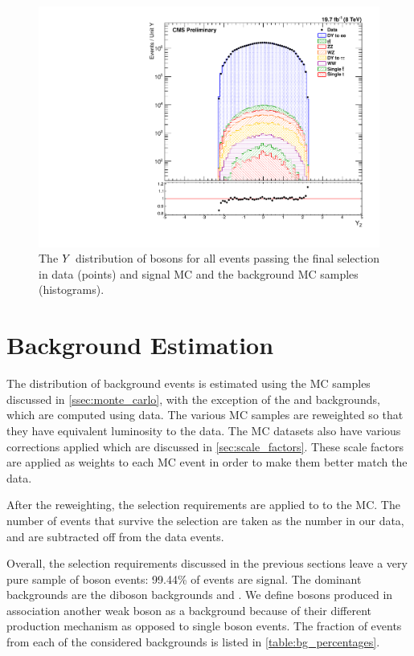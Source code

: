 \begin{figure}[!htbp]
    \centering
    \includegraphics[width=\textwidth]{figures/z_rapidity_powheg.pdf}
    \caption[
        The $\rapidity$ distribution of \Z bosons in data and MC with \POWHEG
        signal MC.
    ]{
        The $\rapidity$ distribution of \Z bosons for all events passing the
        final selection in data (points) and \POWHEG signal MC and the
        background MC samples (histograms).
    }
    \label{fig:z_rapidity_powheg}
\end{figure}

\section{Background Estimation}
\label{sec:background}

The distribution of background events is estimated using the MC samples
discussed in \cref{ssec:monte_carlo}, with the exception of the \QCDjets
and \wjets backgrounds, which are computed using data. The various MC samples
are reweighted so that they have equivalent luminosity to the data. The MC
datasets also have various corrections applied which are discussed in
\cref{sec:scale_factors}. These scale factors are applied as weights to
each MC event in order to make them better match the data.

After the reweighting, the selection requirements are applied to to the MC. The
number of events that survive the selection are taken as the number in our
data, and are subtracted off from the data events.

Overall, the selection requirements discussed in the previous sections leave a
very pure sample of \Z boson events: 99.44\% of events are signal. The dominant
backgrounds are the diboson backgrounds and \ttbar. We define \Z bosons
produced in association another weak boson as a background because of their
different production mechanism as opposed to single \Z boson events. The
fraction of events from each of the considered backgrounds is listed in
\cref{table:bg_percentages}.

